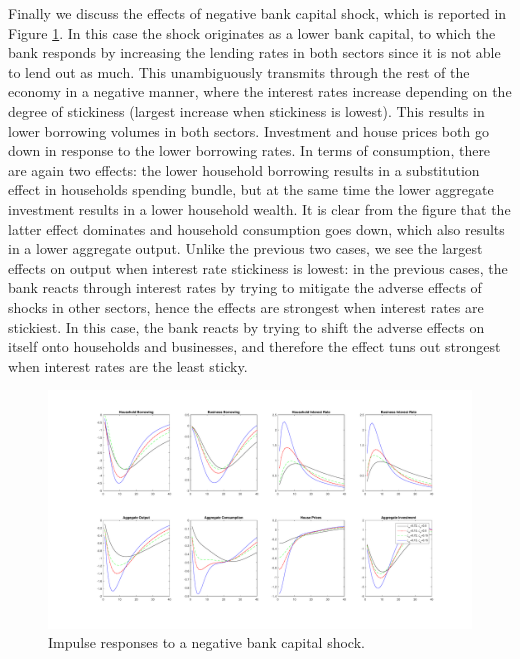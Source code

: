 \documentclass[12pt]{article}
\numberwithin{equation}{section}
\begin{document}
Finally we discuss the effects of negative bank capital shock, which is reported in Figure \ref{irf_stickiness_ECAB}. In this case the shock originates as a lower bank capital, to which the bank responds by increasing the lending rates in both sectors since it is not able to lend out as much. This unambiguously transmits through the rest of the economy in a negative manner, where the interest rates increase depending on the degree of stickiness (largest increase when stickiness is lowest). This results in lower borrowing volumes in both sectors. Investment and house prices both go down in response to the lower borrowing rates. In terms of consumption, there are again two effects: the lower household borrowing results in a substitution effect in households spending bundle, but at the same time the lower aggregate investment results in a lower household wealth. It is clear from the figure that the latter effect dominates and household consumption goes down, which also results in a lower aggregate output. Unlike the previous two cases, we see the largest effects on output when interest rate stickiness is lowest: in the previous cases, the bank reacts through interest rates by trying to mitigate the adverse effects of shocks in other sectors, hence the effects are strongest when interest rates are stickiest. In this case, the bank reacts by trying to shift the adverse effects on itself onto households and businesses, and therefore the effect tuns out strongest when interest rates are the least sticky. 



\begin{figure}[H]
\centering
\caption{Impulse responses to a negative bank capital shock.}
\label{irf_stickiness_ECAB}
\includegraphics[scale=0.4]{stickinessNegativeShocksECAB.pdf}
\end{figure}
\end{document}
